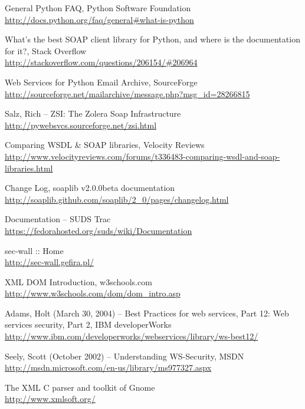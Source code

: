\begin{thebibliography}{99}
General Python FAQ, Python Software Foundation\\
\url{http://docs.python.org/faq/general#what-is-python}

What's the best SOAP client library for Python, and where is the documentation for it?, Stack Overflow\\
\url{http://stackoverflow.com/questions/206154/#206964}

Web Services for Python Email Archive, SourceForge\\
\url{http://sourceforge.net/mailarchive/message.php?msg_id=28266815}

Salz, Rich -- ZSI: The Zolera Soap Infrastructure\\
\url{http://pywebsvcs.sourceforge.net/zsi.html}

Comparing WSDL & SOAP libraries, Velocity Reviews\\
\url{http://www.velocityreviews.com/forums/t336483-comparing-wsdl-and-soap-libraries.html}

Change Log, soaplib v2.0.0beta documentation\\
\url{http://soaplib.github.com/soaplib/2_0/pages/changelog.html}

Documentation -- SUDS Trac\\
\url{https://fedorahosted.org/suds/wiki/Documentation}

sec-wall :: Home\\
\url{http://sec-wall.gefira.pl/}

XML DOM Introduction, w3schools.com\\
\url{http://www.w3schools.com/dom/dom_intro.asp}

Adams, Holt (March 30, 2004) -- Best Practices for web services, Part 12: Web services security, Part 2, IBM developerWorks\\
\url{http://www.ibm.com/developerworks/webservices/library/ws-best12/}

Seely, Scott (October 2002) -- Understanding WS-Security, MSDN\\
\url{http://msdn.microsoft.com/en-us/library/ms977327.aspx}

The XML C parser and toolkit of Gnome\\
\url{http://www.xmlsoft.org/}


\end{thebibliography}
